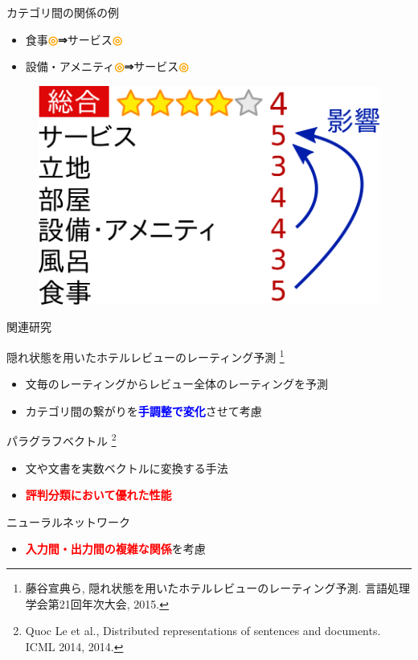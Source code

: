\documentclass[aspectratio=43,unicode,10pt]{beamer}
\newcommand{\fire}[1]{\textcolor{red}{\textbf{#1}}}
\newcommand{\freeze}[1]{\textcolor{blue}{\textbf{#1}}}
\newcommand{\then}{\textcolor{ttiblue}{\textbf{⇒}}\hspace{1ex}}
\newcommand{\up}{\textcolor{orange}{\textbf{◎}}\hspace{1ex}}
\begin{document}
\begin{frame}{カテゴリ間の関係の例}{}
  \begin{itemize}
    \item 食事\up \then サービス\up
    \item 設備・アメニティ\up \then サービス\up
  \end{itemize}
  \begin{figure}
    \includegraphics[width=0.6\linewidth]
                    {fig/relations_among_rating_categories.png}
  \end{figure}
\end{frame}

\begin{frame}{関連研究}{}
  \begin{block}{隠れ状態を用いたホテルレビューのレーティング予測
                \footnote[frame]{
    藤谷宣典ら,
    隠れ状態を用いたホテルレビューのレーティング予測.
    言語処理学会第21回年次大会, 2015.
  }}
    \begin{itemize}
      \item 文毎のレーティングからレビュー全体のレーティングを予測
      \item カテゴリ間の繋がりを\freeze{手調整で変化}させて考慮
    \end{itemize}
  \end{block}
  \begin{block}{パラグラフベクトル
                \footnote[frame]{
    Quoc Le et al.,
    Distributed representations of sentences and documents.
    ICML 2014, 2014.
  }}
    \begin{itemize}
      \item 文や文書を実数ベクトルに変換する手法
      \item \fire{評判分類において優れた性能}
    \end{itemize}
  \end{block}
  \begin{block}{ニューラルネットワーク}
    \begin{itemize}
      \item \fire{入力間・出力間の複雑な関係}を考慮
    \end{itemize}
  \end{block}
\end{frame}
\end{document}
